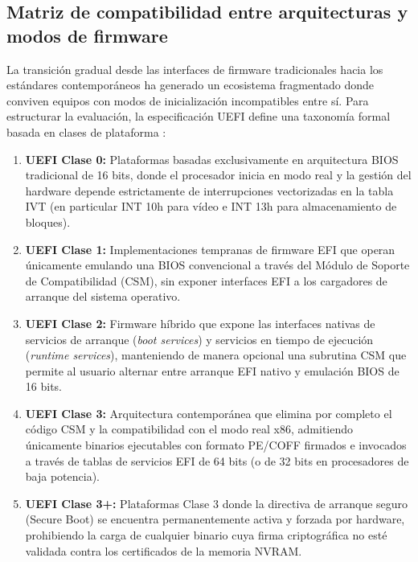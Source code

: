 \documentclass[12pt]{article}
\begin{document}
\subsection{Matriz de compatibilidad entre arquitecturas y modos de firmware}
\label{sec:matrizCompatibilidad}

La transición gradual desde las interfaces de firmware tradicionales hacia los estándares contemporáneos ha generado un ecosistema fragmentado donde conviven equipos con modos de inicialización incompatibles entre sí. Para estructurar la evaluación, la especificación UEFI define una taxonomía formal basada en clases de plataforma \parencite{uefi2024specification}:

\begin{enumerate}[noitemsep, topsep=2pt]
    \item \textbf{UEFI Clase 0:} Plataformas basadas exclusivamente en arquitectura BIOS tradicional de 16 bits, donde el procesador inicia en modo real y la gestión del hardware depende estrictamente de interrupciones vectorizadas en la tabla IVT (en particular INT 10h para vídeo e INT 13h para almacenamiento de bloques).
    \item \textbf{UEFI Clase 1:} Implementaciones tempranas de firmware EFI que operan únicamente emulando una BIOS convencional a través del Módulo de Soporte de Compatibilidad (CSM), sin exponer interfaces EFI a los cargadores de arranque del sistema operativo.
    \item \textbf{UEFI Clase 2:} Firmware híbrido que expone las interfaces nativas de servicios de arranque (\textit{boot services}) y servicios en tiempo de ejecución (\textit{runtime services}), manteniendo de manera opcional una subrutina CSM que permite al usuario alternar entre arranque EFI nativo y emulación BIOS de 16 bits.
    \item \textbf{UEFI Clase 3:} Arquitectura contemporánea que elimina por completo el código CSM y la compatibilidad con el modo real x86, admitiendo únicamente binarios ejecutables con formato PE/COFF firmados e invocados a través de tablas de servicios EFI de 64 bits (o de 32 bits en procesadores de baja potencia).
    \item \textbf{UEFI Clase 3+:} Plataformas Clase 3 donde la directiva de arranque seguro (Secure Boot) se encuentra permanentemente activa y forzada por hardware, prohibiendo la carga de cualquier binario cuya firma criptográfica no esté validada contra los certificados de la memoria NVRAM.
\end{enumerate}
\end{document}
